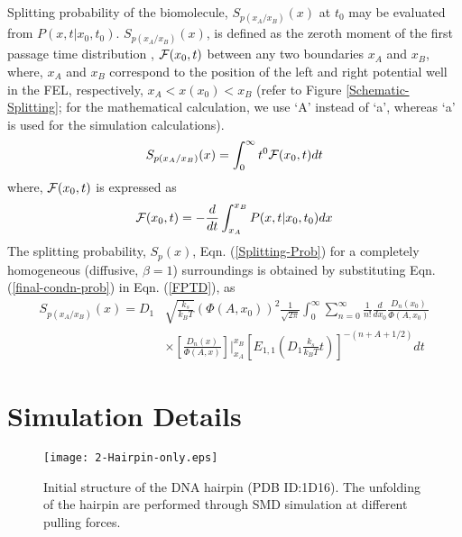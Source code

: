 \documentclass[twoside,twocolumn,9pt]{article}
\begin{document}
Splitting probability of the biomolecule, $S_{p(x_{A}/x_{B})}(x)$ at $t_{0}$ may be evaluated from $P(x,t|x_{0},t_{0})$.  
$S_{p(x_{A}/x_{B})}(x)$, is defined as the zeroth moment of the first passage time distribution \cite{kim2015mean}, 
${\cal{F}}(x_{0},t)$ between any two boundaries $x_{A}$ and $x_{B}$, where, $x_{A}$ and $x_{B}$ correspond
to the position of the left and right potential well in the FEL, respectively, $x_{A}<x(x_{0})<x_{B}$ 
(refer to Figure \ref{Schematic-Splitting}; for the mathematical calculation, we use `A' instead of `a',
whereas `a' is used for the simulation calculations).
\begin{equation}
S_{p(x_{A}/x_{B})}(x)=\int_{0}^{\infty} t^{0} {\cal{F}}(x_{0},t) dt
\label{Splitting-Prob}     
\end{equation}  
where, ${\cal{F}}(x_{0},t)$ is expressed \cite{sharma2022analysis} as
\begin{equation}
{\cal{F}}(x_{0},t)=-\frac{d}{dt}\int_{x_{A}}^{{x_{B}}} P(x,t|x_{0},t_{0}) dx
\label{FPTD}     
\end{equation}
The splitting probability, $S_{p}(x)$, Eqn. (\ref{Splitting-Prob}) for a completely homogeneous 
(diffusive, $\beta=1$) surroundings is obtained by substituting Eqn. (\ref{final-condn-prob}) in Eqn. (\ref{FPTD}), 
as
\begin{equation}
\begin{split}
S_{p(x_{A}/x_{B})}(x)=D_{1}&\sqrt{\frac{k_{s}}{k_{B}T}} \left(\Phi{(A,x_{0})}\right)^2 \frac{1}{\sqrt{2\pi}} \int_{0}^{\infty} \sum_{n=0}^{\infty}  
					\frac{1}{n!} \frac{d}{dx_{0}} \frac{D_{n}(x_{0})}{\Phi(A,x_{0})}\\
					&\times {\left[\frac{D_n{(x)}}{\Phi{(A,x)}}\right]{\Biggr|}_{x_A}^{x_{B}}}
					\left[E_{1,1}\left(D_{1}\frac{k_{s}}{k_{B}T}t\right)\right]^{-\left(n+A+1/2\right)} dt
\label{final-Splitting-Prob}
\end{split}
\end{equation}
\section{Simulation Details}
\begin{figure}[h!]
\centering
\texttt{[image: 2-Hairpin-only.eps]}
\caption{Initial structure of the DNA hairpin (PDB ID:1D16). The unfolding of the hairpin are performed through 
SMD simulation at different pulling forces.} 
\label{Structures-SI}
\end{figure}
\end{document}
